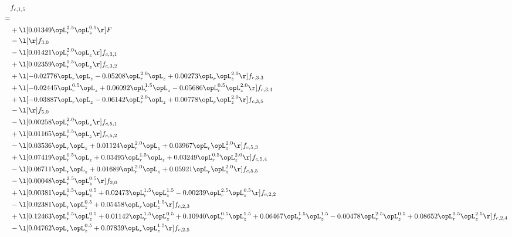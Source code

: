 \begin{alignat}{2} 
\label{eq:f_15_2} 
& f_{c,1,5} \nonumber \\ 
 = \\ 
& + \l[  0.01349 \opL_r^{2.5} \opL_z^{0.5}  \r] F \nonumber \\ 
& - \l[  \r] f_{3,0} \nonumber \\ 
& - \l[  0.01421 \opL_r^{2.0} \opL_z  \r] f_{c,3,1} \nonumber \\ 
& + \l[  0.02359 \opL_r^{1.5} \opL_z  \r] f_{c,3,2} \nonumber \\ 
& + \l[  -0.02776 \opL_r \opL_z   -0.05208 \opL_r^{2.0} \opL_z +  0.00273 \opL_r \opL_z^{2.0}  \r] f_{c,3,3} \nonumber \\ 
& + \l[  -0.02445 \opL_r^{0.5} \opL_z +  0.06092 \opL_r^{1.5} \opL_z   -0.05686 \opL_r^{0.5} \opL_z^{2.0}  \r] f_{c,3,4} \nonumber \\ 
& + \l[  -0.03887 \opL_r \opL_z   -0.06142 \opL_r^{2.0} \opL_z +  0.00778 \opL_r \opL_z^{2.0}  \r] f_{c,3,5} \nonumber \\ 
& - \l[  \r] f_{5,0} \nonumber \\ 
& - \l[  0.00258 \opL_r^{2.0} \opL_z  \r] f_{c,5,1} \nonumber \\ 
& + \l[  0.01165 \opL_r^{1.5} \opL_z  \r] f_{c,5,2} \nonumber \\ 
& - \l[  0.03536 \opL_r \opL_z +  0.01124 \opL_r^{2.0} \opL_z +  0.03967 \opL_r \opL_z^{2.0}  \r] f_{c,5,3} \nonumber \\ 
& + \l[  0.07419 \opL_r^{0.5} \opL_z +  0.03495 \opL_r^{1.5} \opL_z +  0.03249 \opL_r^{0.5} \opL_z^{2.0}  \r] f_{c,5,4} \nonumber \\ 
& - \l[  0.06711 \opL_r \opL_z +  0.01689 \opL_r^{2.0} \opL_z +  0.05921 \opL_r \opL_z^{2.0}  \r] f_{c,5,5} \nonumber \\ 
& - \l[  0.00048 \opL_r^{2.5} \opL_z^{0.5}  \r] f_{2,0} \nonumber \\ 
& + \l[  0.00381 \opL_r^{1.5} \opL_z^{0.5} +  0.02473 \opL_r^{1.5} \opL_z^{1.5}   -0.00239 \opL_r^{2.5} \opL_z^{0.5}  \r] f_{c,2,2} \nonumber \\ 
& - \l[  0.02381 \opL_r \opL_z^{0.5} +  0.05458 \opL_r \opL_z^{1.5}  \r] f_{c,2,3} \nonumber \\ 
& + \l[  0.12463 \opL_r^{0.5} \opL_z^{0.5} +  0.01142 \opL_r^{1.5} \opL_z^{0.5} +  0.10940 \opL_r^{0.5} \opL_z^{1.5} +  0.06467 \opL_r^{1.5} \opL_z^{1.5}   -0.00478 \opL_r^{2.5} \opL_z^{0.5} +  0.08652 \opL_r^{0.5} \opL_z^{2.5}  \r] f_{c,2,4} \nonumber \\ 
& - \l[  0.04762 \opL_r \opL_z^{0.5} +  0.07839 \opL_r \opL_z^{1.5}  \r] f_{c,2,5} \nonumber \\ 

\end{alignat}
